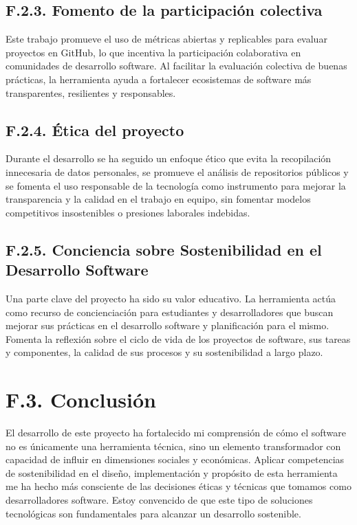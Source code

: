 \subsection{F.2.3. Fomento de la participación colectiva}
Este trabajo promueve el uso de métricas abiertas y replicables para evaluar proyectos en GitHub, lo que incentiva la participación colaborativa en comunidades de desarrollo software. Al facilitar la evaluación colectiva de buenas prácticas, la herramienta ayuda a fortalecer ecosistemas de software más transparentes, resilientes y responsables.

\subsection{F.2.4. Ética del proyecto}
Durante el desarrollo se ha seguido un enfoque ético que evita la recopilación innecesaria de datos personales, se promueve el análisis de repositorios públicos y se fomenta el uso responsable de la tecnología como instrumento para mejorar la transparencia y la calidad en el trabajo en equipo, sin fomentar modelos competitivos insostenibles o presiones laborales indebidas.

\subsection{F.2.5. Conciencia sobre Sostenibilidad en el Desarrollo Software}
Una parte clave del proyecto ha sido su valor educativo. La herramienta actúa como recurso de concienciación para estudiantes y desarrolladores que buscan mejorar sus prácticas en el desarrollo software y planificación para el mismo. Fomenta la reflexión sobre el ciclo de vida de los proyectos de software, sus tareas y componentes, la calidad de sus procesos y su sostenibilidad a largo plazo.

\section{F.3. Conclusión}
El desarrollo de este proyecto ha fortalecido mi comprensión de cómo el software no es únicamente una herramienta técnica, sino un elemento transformador con capacidad de influir en dimensiones sociales y económicas. Aplicar competencias de sostenibilidad en el diseño, implementación y propósito de esta herramienta me ha hecho más consciente de las decisiones éticas y técnicas que tomamos como desarrolladores software. Estoy convencido de que este tipo de soluciones tecnológicas son fundamentales para alcanzar un desarrollo sostenible.